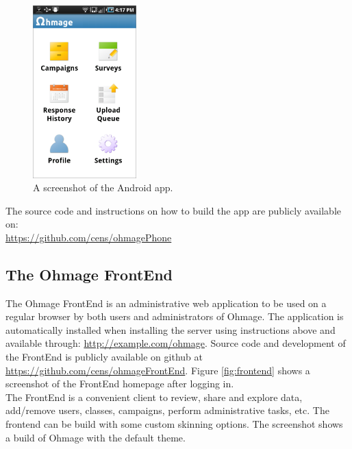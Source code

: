 \documentclass{scrartcl}
\begin{document}
\begin{figure}[h!]
\begin{center}
\includegraphics[width=4cm]{app.png}
\caption{A screenshot of the Android app.}
\label{fig:phone}
\end{center}
\end{figure}

\noindent The source code and instructions on how to build the app are publicly
available on: \\

\url{https://github.com/cens/ohmagePhone} \\

\subsection{The Ohmage FrontEnd}

The Ohmage FrontEnd is an administrative web application to be used on a regular
browser by both users and administrators of Ohmage. The application is
automatically installed when installing the server using instructions above and
available through: \url{http://example.com/ohmage}. Source code and
development of the FrontEnd is publicly available on github at
\url{https://github.com/cens/ohmageFrontEnd}. Figure \ref{fig:frontend} shows a
screenshot of the FrontEnd homepage after logging in. \\

\noindent The FrontEnd is a convenient client to review, share and explore data,
add/remove users, classes, campaigns, perform administrative tasks, etc. The
frontend can be build with some custom skinning options. The screenshot shows a build of
Ohmage with the default theme.
\end{document}
